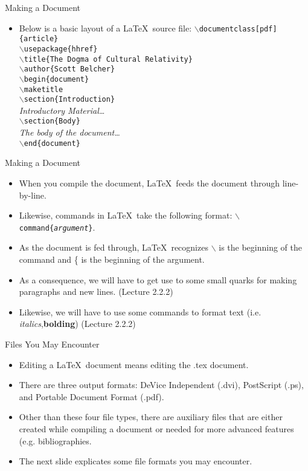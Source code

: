 \documentclass[pdf]{prosper}
\begin{document}
\begin{slide}{Making a Document}
	\begin{itemize}
		\item Below is a basic layout of a \LaTeX\ source file:
			\small
				\texttt{$\backslash$documentclass[pdf]\{article\}} \\
				\texttt{$\backslash$usepackage\{hhref\}} \\
				\texttt{$\backslash$title\{The Dogma of Cultural Relativity\}} \\
				\texttt{$\backslash$author\{Scott Belcher\}} \\
				\texttt{$\backslash$begin\{document\}} \\
				\texttt{$\backslash$maketitle} \\
				\texttt{$\backslash$section\{Introduction\}} \\
				\rmfamily\textit{Introductory Material\ldots} \\
				\texttt{$\backslash$section\{Body\}} \\
				\rmfamily\textit{The body of the document\ldots} \\
				\texttt{$\backslash$end\{document\}} \\
	\end{itemize}
\end{slide}
\begin{slide}{Making a Document}
	\begin{itemize}
		\item When you compile the document, \LaTeX\ feeds the document through line-by-line.
		\item Likewise, commands in \LaTeX\ take the following format: \texttt{$\backslash$command\{\textit{argument}\}}.
		\item As the document is fed through, \LaTeX\ recognizes $\backslash$ is the beginning of the command and \{ is the beginning of the argument.
		\item As a consequence, we will have to get use to some small quarks for making paragraphs and new lines. (Lecture 2.2.2)
		\item Likewise, we will have to use some commands to format text (i.e. \textit{italics},\textbf{bolding}) (Lecture 2.2.2)
	\end{itemize}
\end{slide}
\begin{slide}{Files You May Encounter}
	\begin{itemize}
		\item Editing a \LaTeX\ document means editing the .tex document.
		\item There are three output formats: DeVice Independent (.dvi), PostScript (.ps), and Portable Document Format (.pdf).
		\item Other than these four file types, there are auxiliary files that are either created while compiling a document or needed for more advanced features (e.g. bibliographies.
		\item The next slide explicates some file formats you may encounter.
	\end{itemize}
\end{slide}
\end{document}
